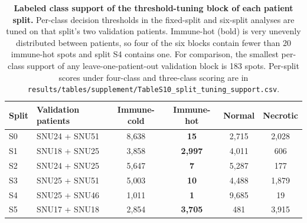 \documentclass[11pt,letterpaper]{article}
\begin{document}
\begin{table}[H]
\centering
\caption{\textbf{Labeled class support of the threshold-tuning block of each patient split.} Per-class decision thresholds in the fixed-split and six-split analyses are tuned on that split's two validation patients. Immune-hot (bold) is very unevenly distributed between patients, so four of the six blocks contain fewer than 20 immune-hot spots and split S4 contains one. For comparison, the smallest per-class support of any leave-one-patient-out validation block is 183 spots. Per-split scores under four-class and three-class scoring are in \texttt{results/tables/supplement/TableS10\_split\_tuning\_support.csv}.}
\label{tab:s10}
\small
\begin{tabular}{llcccc}
\toprule
\textbf{Split} & \textbf{Validation patients} & \textbf{Immune-cold} & \textbf{Immune-hot} & \textbf{Normal} & \textbf{Necrotic} \\
\midrule
S0 & SNU24 + SNU51 & 8{,}638 & \textbf{15} & 2{,}715 & 2{,}028 \\
S1 & SNU18 + SNU25 & 3{,}858 & \textbf{2{,}997} & 4{,}011 & 606 \\
S2 & SNU24 + SNU25 & 5{,}647 & \textbf{7} & 5{,}287 & 177 \\
S3 & SNU25 + SNU51 & 5{,}003 & \textbf{10} & 4{,}488 & 1{,}879 \\
S4 & SNU25 + SNU46 & 1{,}011 & \textbf{1} & 9{,}685 & 19 \\
S5 & SNU17 + SNU18 & 2{,}854 & \textbf{3{,}705} & 481 & 3{,}915 \\
\bottomrule
\end{tabular}
\end{table}

\vspace{1.5em}
\end{document}
